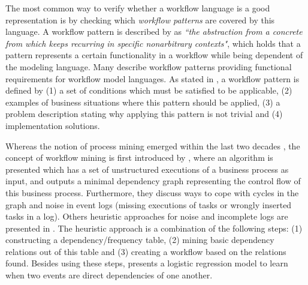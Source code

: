 \documentclass[a4paper,11pt]{article}
\begin{document}
The most common way to verify whether a workflow language is a good representation is by checking which \textit{workflow patterns} are covered by this language. A workflow pattern is described by \cite{Riehle1996} as \textit{``the abstraction from a concrete from which keeps recurring in specific nonarbitrary contexts"}, which holds that a pattern represents a certain functionality in a workflow while being dependent of the modeling language. Many \cite{VanderAalst2003Patterns,Dijkstra2003ControlPatterns,Russell2004DataPatterns,Russell2005ResourcePatterns,Russell2006ExceptionPatterns} describe workflow patterns providing functional requirements for workflow model languages. As stated in \cite{VanderAalst2003Patterns,Dijkstra2003ControlPatterns,Russell2004DataPatterns,Russell2005ResourcePatterns,Russell2006ExceptionPatterns}, a workflow pattern is defined by (1) a set of conditions which must be satisfied to be applicable, (2) examples of business situations where this pattern should be applied, (3) a problem description stating why applying this pattern is not trivial and (4) implementation solutions.

Whereas the notion of process mining emerged within the last two decades \cite{VanderAalst2003}, the concept of workflow mining is first introduced by \cite{Agrawal1998}, where an algorithm is presented which has a set of unstructured executions of a business process as input, and outputs a minimal dependency graph representing the control flow of this business process. Furthermore, they discuss ways to cope with cycles in the graph and noise in event logs (missing executions of tasks or wrongly inserted tasks in a log). Others heuristic approaches for noise and incomplete logs are presented in \cite{Maruster2002,Weijters2001,Weijters}. The heuristic approach \cite{Weijters2001,Weijters} is a combination of the following steps: (1) constructing a dependency/frequency table, (2) mining basic dependency relations out of this table and (3) creating a workflow based on the relations found. Besides using these steps, \cite{Maruster2002} presents a logistic regression model to learn when two events are direct dependencies of one another. 
\end{document}
